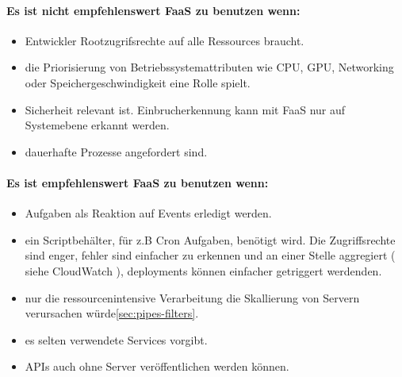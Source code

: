 \documentclass[
12pt,
english,
ngerman,
headsepline,
twoside,
openright,
numbers=noenddot,version=first
]{scrreprt}
\begin{document}
\paragraph{Es ist nicht empfehlenswert \acrshort{FaaS} zu benutzen wenn:}
\begin{itemize}
	\item Entwickler Rootzugrifsrechte auf alle Ressources braucht.
	\item die Priorisierung von Betriebssystemattributen wie CPU, GPU, Networking oder Speichergeschwindigkeit eine Rolle spielt.
	\item Sicherheit relevant ist. Einbrucherkennung kann mit \acrshort{FaaS} nur auf Systemebene erkannt werden.
	\item dauerhafte Prozesse angefordert sind.
\end{itemize}




\paragraph{Es ist empfehlenswert \acrshort{FaaS} zu benutzen wenn:}
\begin{itemize}
	\item Aufgaben als Reaktion auf Events erledigt werden. 
	\item ein Scriptbehälter, für z.B Cron Aufgaben, benötigt wird. Die Zugriffsrechte sind enger, fehler sind einfacher zu erkennen und an einer Stelle aggregiert ( siehe CloudWatch ), deployments können einfacher getriggert werdenden.
	\item nur die ressourcenintensive Verarbeitung die Skallierung von Servern verursachen würde\ref{sec:pipes-filters}.
	\item es selten verwendete Services vorgibt.
	\item \acrshort{API}s auch ohne Server veröffentlichen werden können.
\end{itemize}
\end{document}

